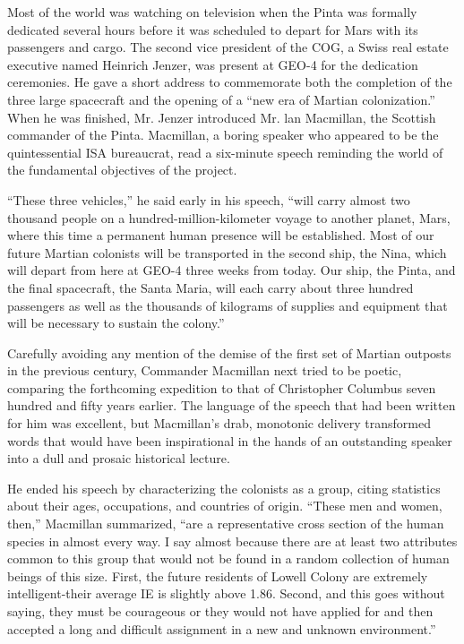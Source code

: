 \documentclass[]{article}
\begin{document}
{Most of the world was watching on television when the Pinta was formally dedicated several hours before it was scheduled to depart for Mars with its passengers and cargo. The second vice president of the COG, a Swiss real estate executive named Heinrich Jenzer, was present at GEO-4 for the dedication ceremonies. He gave a short address to commemorate both the completion of the three large spacecraft and the opening of a “new era of Martian colonization.” When he was finished, Mr. Jenzer introduced Mr. lan Macmillan, the Scottish commander of the Pinta. Macmillan, a boring speaker who appeared to be the quintessential ISA bureaucrat, read a six-minute speech reminding the world of the fundamental objectives of the project.

“These three vehicles,” he said early in his speech, “will carry almost two thousand people on a hundred-million-kilometer voyage to another planet, Mars, where this time a permanent human presence will be established. Most of our future Martian colonists will be transported in the second ship, the Nina, which will depart from here at GEO-4 three weeks from today. Our ship, the Pinta, and the final spacecraft, the Santa Maria, will each carry about three hundred passengers as well as the thousands of kilograms of supplies and equipment that will be necessary to sustain the colony.”

Carefully avoiding any mention of the demise of the first set of Martian outposts in the previous century, Commander Macmillan next tried to be poetic, comparing the forthcoming expedition to that of Christopher Columbus seven hundred and fifty years earlier. The language of the speech that had been written for him was excellent, but Macmillan’s drab, monotonic delivery transformed words that would have been inspirational in the hands of an outstanding speaker into a dull and prosaic historical lecture.

He ended his speech by characterizing the colonists as a group, citing statistics about their ages, occupations, and countries of origin. “These men and women, then,” Macmillan summarized, “are a representative cross section of the human species in almost every way. I say almost because there are at least two attributes common to this group that would not be found in a random collection of human beings of this size. First, the future residents of Lowell Colony are extremely intelligent-their average IE is slightly above 1.86. Second, and this goes without saying, they must be courageous or they would not have applied for and then accepted a long and difficult assignment in a new and unknown environment.”

}
\end{document}
